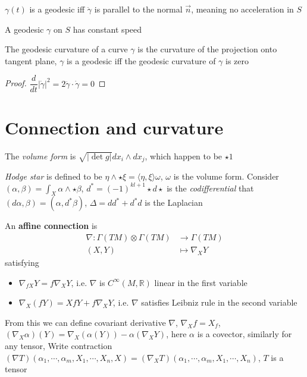 \documentclass[main]{subfiles}
\begin{document}
\begin{lemma}
$\gamma(t)$ is a geodesic iff $\ddot\gamma$ is parallel to the normal $\vec n$, meaning no acceleration in $S$ \par
A geodesic $\gamma$ on $S$ has constant speed \par
The geodesic curvature of a curve $\gamma$ is the curvature of the projection onto tangent plane, $\gamma$ is a geodesic iff the geodesic curvature of $\gamma$ is zero
\end{lemma}

\begin{proof}
$\dfrac{d}{dt}|\dot\gamma|^2=2\ddot\gamma\cdot\dot\gamma=0$
\end{proof}



\section{Connection and curvature}

\begin{definition}
The \textit{volume form} is $\sqrt{|\det g|}dx_i\wedge dx_j$, which happen to be $\star1$
\end{definition}

\begin{definition}
\textit{Hodge star} is defined to be $\eta\wedge\star\xi=\langle\eta,\xi\rangle\omega$, $\omega$ is the volume form. Consider $(\alpha,\beta)=\int_X\alpha\wedge\star\beta$, $d^*=(-1)^{kl+1}\star d\star$ is the \textit{codifferential} that $(d\alpha,\beta)=(\alpha,d^*\beta)$, $\Delta=dd^*+d^*d$ is the Laplacian
\end{definition}

\begin{definition}
An \textbf{affine connection} is
\begin{align*}
\nabla:\Gamma(TM)\otimes\Gamma(TM)&\to\Gamma(TM) \\
(X,Y)&\mapsto\nabla_XY
\end{align*}satisfying
\begin{itemize}
\item $\nabla_{fX}Y=f\nabla_XY$, i.e. $\nabla$ is $C^\infty(M,\mathbb R)$ linear in the first variable
\item $\nabla_X(fY)=XfY+f\nabla_XY$, i.e. $\nabla$ satisfies Leibniz rule in the second variable
\end{itemize}
From this we can define covariant derivative $\nabla$, $\nabla_Xf=X_f$, $(\nabla_X\alpha)(Y)=\nabla_X(\alpha(Y))-\alpha(\nabla_XY)$, here $\alpha$ is a covector, similarly for any tensor, Write contraction $(\nabla T)(\alpha_1,\cdots,\alpha_m,X_1,\cdots,X_n,X)=(\nabla_XT)(\alpha_1,\cdots,\alpha_m,X_1,\cdots,X_n)$, $T$ is a tensor
\end{definition}
\end{document}
